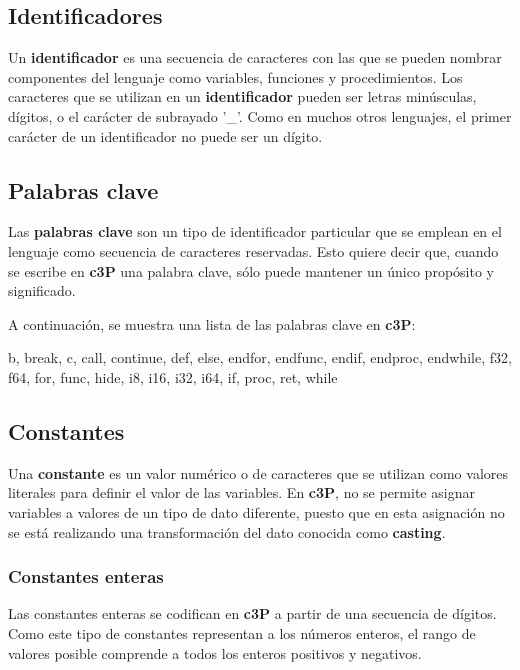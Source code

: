 \subsection{Identificadores}

Un \textbf{identificador} es una secuencia de caracteres con las que se pueden
nombrar componentes del lenguaje como variables, funciones y procedimientos. Los
caracteres que se utilizan en un \textbf{identificador} pueden ser letras minúsculas,
dígitos, o el carácter de subrayado '\_'. Como en muchos otros lenguajes, el primer
carácter de un identificador no puede ser un dígito.

\subsection{Palabras clave}

Las \textbf{palabras clave} son un tipo de identificador particular que se emplean en el
lenguaje como secuencia de caracteres reservadas. Esto quiere decir que, cuando se escribe
en \textbf{c3P} una palabra clave, sólo puede mantener un único propósito y significado.

A continuación, se muestra una lista de las palabras clave en \textbf{c3P}:

b, break, c, call, continue, def, else, endfor, endfunc, endif, endproc,
endwhile, f32, f64, for, func, hide, i8, i16, i32, i64, if, proc,
ret, while

\subsection{Constantes}

Una \textbf{constante} es un valor numérico o de caracteres que se utilizan como valores
literales para definir el valor de las variables. En \textbf{c3P}, no se permite asignar
variables a valores de un tipo de dato diferente, puesto que en esta asignación no se
está realizando una transformación del dato conocida como \textbf{casting}.

\subsubsection{Constantes enteras}

Las constantes enteras se codifican en \textbf{c3P} a partir de una secuencia de dígitos.
Como este tipo de constantes representan a los números enteros, el rango de valores posible
comprende a todos los enteros positivos y negativos.


